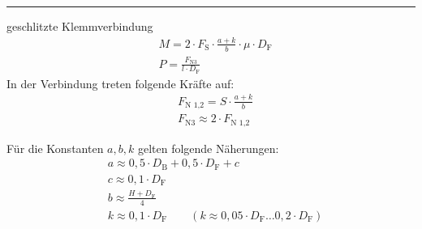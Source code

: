 \pagebreak
\hrule
\begin{eeqn}{geschlitzte Klemmverbindung}
	\begin{align}
		& M = 2\cdot F_\text{S} \cdot \frac{a+k}{b} \cdot \mu \cdot D_\text{F} \\
		& P = \frac{F_\text{N3}}{l\cdot D_\text{F}}
	\end{align}
	In der Verbindung treten folgende Kräfte auf:
	\begin{align}
		&F_\text{N 1,2} = S \cdot \frac{a+k}{b} \\
		&F_\text{N3} \approx 2 \cdot F_\text{N 1,2}
	\end{align}

	Für die Konstanten $a, b, k$ gelten folgende Näherungen:
	\begin{align}
		&a  \approx 0,5 \cdot D_\text{B} + 0,5 \cdot D_\text{F}+ c\\
		&c \approx 0,1 \cdot D_\text{F}\\
		&b \approx \frac{H+D_\text{F}}{4} \\
		&k \approx 0,1 \cdot D_\text{F} \qquad (k\approx 0,05 \cdot D_\text{F} \ldots  0,2 \cdot D_\text{F})
	\end{align}
\end{eeqn}

